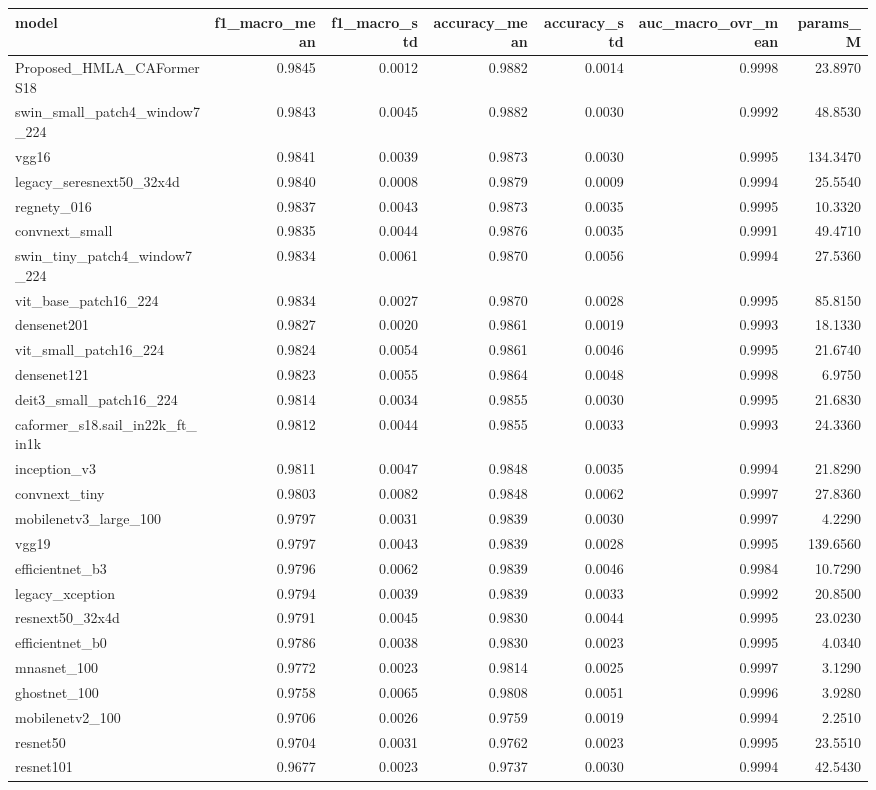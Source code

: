 \begin{tabular}{lrrrrrr}
\toprule
model & f1_macro_mean & f1_macro_std & accuracy_mean & accuracy_std & auc_macro_ovr_mean & params_M \\
\midrule
Proposed_HMLA_CAFormerS18 & 0.9845 & 0.0012 & 0.9882 & 0.0014 & 0.9998 & 23.8970 \\
swin_small_patch4_window7_224 & 0.9843 & 0.0045 & 0.9882 & 0.0030 & 0.9992 & 48.8530 \\
vgg16 & 0.9841 & 0.0039 & 0.9873 & 0.0030 & 0.9995 & 134.3470 \\
legacy_seresnext50_32x4d & 0.9840 & 0.0008 & 0.9879 & 0.0009 & 0.9994 & 25.5540 \\
regnety_016 & 0.9837 & 0.0043 & 0.9873 & 0.0035 & 0.9995 & 10.3320 \\
convnext_small & 0.9835 & 0.0044 & 0.9876 & 0.0035 & 0.9991 & 49.4710 \\
swin_tiny_patch4_window7_224 & 0.9834 & 0.0061 & 0.9870 & 0.0056 & 0.9994 & 27.5360 \\
vit_base_patch16_224 & 0.9834 & 0.0027 & 0.9870 & 0.0028 & 0.9995 & 85.8150 \\
densenet201 & 0.9827 & 0.0020 & 0.9861 & 0.0019 & 0.9993 & 18.1330 \\
vit_small_patch16_224 & 0.9824 & 0.0054 & 0.9861 & 0.0046 & 0.9995 & 21.6740 \\
densenet121 & 0.9823 & 0.0055 & 0.9864 & 0.0048 & 0.9998 & 6.9750 \\
deit3_small_patch16_224 & 0.9814 & 0.0034 & 0.9855 & 0.0030 & 0.9995 & 21.6830 \\
caformer_s18.sail_in22k_ft_in1k & 0.9812 & 0.0044 & 0.9855 & 0.0033 & 0.9993 & 24.3360 \\
inception_v3 & 0.9811 & 0.0047 & 0.9848 & 0.0035 & 0.9994 & 21.8290 \\
convnext_tiny & 0.9803 & 0.0082 & 0.9848 & 0.0062 & 0.9997 & 27.8360 \\
mobilenetv3_large_100 & 0.9797 & 0.0031 & 0.9839 & 0.0030 & 0.9997 & 4.2290 \\
vgg19 & 0.9797 & 0.0043 & 0.9839 & 0.0028 & 0.9995 & 139.6560 \\
efficientnet_b3 & 0.9796 & 0.0062 & 0.9839 & 0.0046 & 0.9984 & 10.7290 \\
legacy_xception & 0.9794 & 0.0039 & 0.9839 & 0.0033 & 0.9992 & 20.8500 \\
resnext50_32x4d & 0.9791 & 0.0045 & 0.9830 & 0.0044 & 0.9995 & 23.0230 \\
efficientnet_b0 & 0.9786 & 0.0038 & 0.9830 & 0.0023 & 0.9995 & 4.0340 \\
mnasnet_100 & 0.9772 & 0.0023 & 0.9814 & 0.0025 & 0.9997 & 3.1290 \\
ghostnet_100 & 0.9758 & 0.0065 & 0.9808 & 0.0051 & 0.9996 & 3.9280 \\
mobilenetv2_100 & 0.9706 & 0.0026 & 0.9759 & 0.0019 & 0.9994 & 2.2510 \\
resnet50 & 0.9704 & 0.0031 & 0.9762 & 0.0023 & 0.9995 & 23.5510 \\
resnet101 & 0.9677 & 0.0023 & 0.9737 & 0.0030 & 0.9994 & 42.5430 \\
\bottomrule
\end{tabular}
